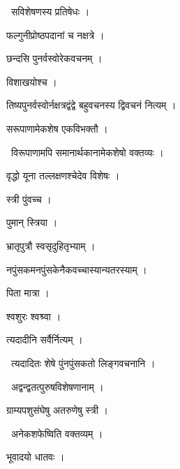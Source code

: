 \documentclass[10pt, openany, oneside]{book}
\begin{document}
\par\noindent\hspace{1.5em}{\vps वा॰}~{\qt सविशेषणस्य प्रतिषेधः ।}

\noindent फल्गुनीप्रोष्ठपदानां च नक्षत्रे ।

\noindent छन्दसि पुनर्वस्वोरेकवचनम् ।

\noindent विशाखयोश्च ।

\noindent तिष्यपुनर्वस्वोर्नक्षत्रद्वंद्वे बहुवचनस्य द्विवचनं नित्यम् ।

\noindent सरूपाणामेकशेष एकविभक्तौ ।

\par\noindent\hspace{1.5em}{\vps वा॰}~{\qt विरूपाणामपि समानार्थकानामेकशेषो वक्तव्यः ।}

\noindent वृद्धो यूना तल्लक्षणश्चेदेव विशेषः ।

\noindent स्त्री पुंवच्च ।

\noindent पुमान् स्त्रिया ।

\noindent भ्रातृपुत्रौ स्वसृदुहितृभ्याम् ।

\noindent नपुंसकमनपुंसकेनैकवच्चास्यान्यतरस्याम् ।

\noindent पिता मात्रा ।

\noindent श्वशुरः श्वश्र्वा ।

\noindent त्यदादीनि सर्वैर्नित्यम् ।

\par\noindent\hspace{1.5em}{\vps वा॰}~{\qt त्यदादितः शेषे पुंनपुंसकतो लिङ्गवचनानि ।}

\par\noindent\hspace{1.5em}{\vps वा॰}~{\qt अद्वन्द्वतत्पुरुषविशेषणानाम् ।}

\noindent ग्राम्यपशुसंघेषु अतरुणेषु स्त्री ।

\par\noindent\hspace{1.5em}{\vps वा॰}~{\qt अनेकशफेष्विति वक्तव्यम् ।}

\noindent भूवादयो धातवः ।
\end{document}
